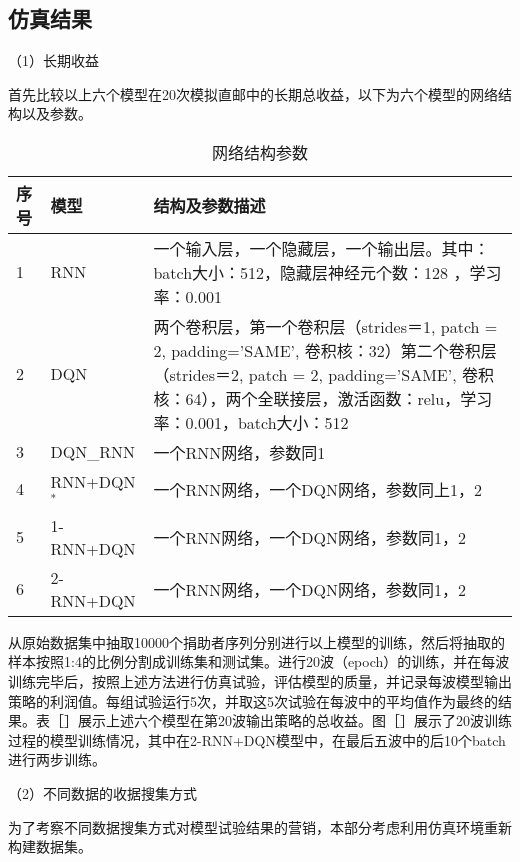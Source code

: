 \subsection{仿真结果}

（1）长期收益

 首先比较以上六个模型在20次模拟直邮中的长期总收益，以下为六个模型的网络结构以及参数。
 
 \begin{table}[htbp]
  \centering
  \caption{网络结构参数}
  \label{tab:wangluojigoucanshu}
  \begin{tabular}{llp{10cm}}  
    \toprule
      序号 &模型 & 结构及参数描述 \\
    \midrule
      1 &RNN &一个输入层，一个隐藏层，一个输出层。其中：batch大小：512，隐藏层神经元个数：128 ，学习率：0.001\\
      2 &DQN & 两个卷积层，第一个卷积层（strides＝1, patch = 2, padding='SAME', 卷积核：32）第二个卷积层（strides＝2, patch = 2, padding='SAME', 卷积核：64），两个全联接层，激活函数：relu，学习率：0.001，batch大小：512\\
      3 &DQN_RNN &一个RNN网络，参数同1 \\
      4 &RNN+DQN$^{*}$ & 一个RNN网络，一个DQN网络，参数同上1，2\\
      5 &1-RNN+DQN & 一个RNN网络，一个DQN网络，参数同1，2\\
      6 &2-RNN+DQN & 一个RNN网络，一个DQN网络，参数同1，2 \\
    \bottomrule
  \end{tabular}
\end{table}

 从原始数据集中抽取10000个捐助者序列分别进行以上模型的训练，然后将抽取的样本按照1:4的比例分割成训练集和测试集。进行20波（epoch）的训练，并在每波训练完毕后，按照上述方法进行仿真试验，评估模型的质量，并记录每波模型输出策略的利润值。每组试验运行5次，并取这5次试验在每波中的平均值作为最终的结果。表［］展示上述六个模型在第20波输出策略的总收益。图［］展示了20波训练过程的模型训练情况，其中在2-RNN+DQN模型中，在最后五波中的后10个batch进行两步训练。

（2）不同数据的收据搜集方式

 为了考察不同数据搜集方式对模型试验结果的营销，本部分考虑利用仿真环境重新构建数据集。


